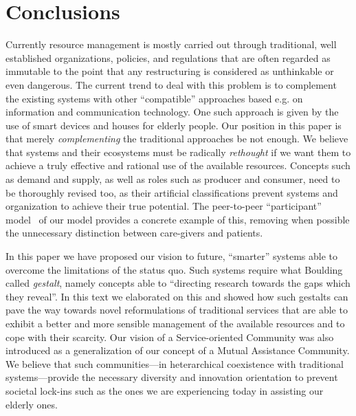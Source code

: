 \documentclass{llncs}
\begin{document}
\section{Conclusions}\label{s:end}


Currently resource management is mostly
carried out through traditional, well established organizations, policies, and 
regulations that are often regarded as immutable to the point that any 
restructuring is considered as unthinkable or even dangerous. The current trend 
to deal with this problem is to complement the existing systems with other ``compatible'' approaches 
based e.g. on information and communication technology. One such approach is 
given by the use of smart devices and houses for elderly people. Our position 
in this paper is that merely \emph{complementing\/} the traditional approaches 
be not enough. We believe that systems and their ecosystems must be radically 
\emph{rethought\/} if we want them to achieve a truly effective and rational use of 
the available resources. Concepts such as demand and supply, as well as roles such as
producer and consumer, need to 
be thoroughly revised too, as their artificial classifications prevent
systems and organization to achieve their true potential.
The peer-to-peer ``participant'' model~\cite{SDGB07a}
of our model provides a concrete example of this,
removing when possible the unnecessary distinction between care-givers and patients.

In this paper we have proposed our 
vision to future, ``smarter'' systems able to overcome the limitations of the 
status quo. Such systems require what Boulding called \emph{gestalt}, namely 
concepts able to ``directing research towards the gaps which they reveal''. In 
this text we elaborated on this and showed how such gestalts can pave the way 
towards novel reformulations of traditional services that are able to exhibit a better and 
more sensible management of the available resources and to cope with their 
scarcity. Our vision of a Service-oriented Community was also introduced as a 
generalization of our concept of a Mutual Assistance Community.
We believe that such communities---in heterarchical 
coexistence with traditional systems---provide the necessary diversity and 
innovation orientation to prevent societal lock-ins such as the ones we are 
experiencing today in assisting our elderly ones. 
\end{document}
